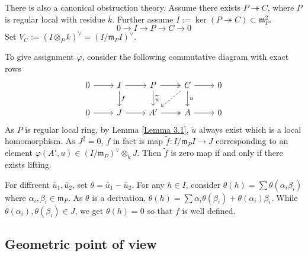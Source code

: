 \documentclass{ctexart}
\begin{document}
There is also a canonical obstruction theory.
Assume there exists $P \twoheadrightarrow C$, where $P$ is regular local with residue $k$.
Further assume $I := \ker(P \twoheadrightarrow C) \subset \mathfrak{m}_{P}^{2}$.
\begin{equation}
    0 \longrightarrow I \longrightarrow P \longrightarrow C \longrightarrow 0
\end{equation}
Set $V_{C} := (I \otimes_{P} k)^{\vee} = (I/\mathfrak{m}_{P}I)^{\vee}$.
\par
To give assignment $\varphi$, consider the following commutative diagram with exact rows
\begin{equation}
    \begin{tikzcd}
        0 \arrow[r] &
        I \arrow[r] \arrow[d, "f"] &
        P \arrow[r, twoheadrightarrow] \arrow[d, "\widetilde{u}"] &
        C \arrow[r] \arrow[d, "u"] \arrow[dl, dashrightarrow] &
        0 \\
        0 \arrow[r] &
        J \arrow[r] &
        A' \arrow[r, twoheadrightarrow] &
        A \arrow[r] &
        0 
    \end{tikzcd}
\end{equation}
As $P$ is regular local ring, by Lemma \ref{Lemma 3.1}, $\widetilde{u}$ always exist which is a local homomorphism.
As $J^{2} = 0$, $f$ in fact is map $\widetilde{f}: I/\mathfrak{m}_{P}I \rightarrow J$ corresponding to an element $\varphi(A', u)\in (I/\mathfrak{m}_{P})^{\vee} \otimes_{k} J$.
Then $\widetilde{f}$ is zero map if and only if there exists lifting.
\par
For diffreent $\widetilde{u_{1}}, \widetilde{u_{2}}$, set $\theta = \widetilde{u_{1}} - \widetilde{u_{2}}$.
For any $h\in I$, consider $\theta(h) = \sum \theta(\alpha_{i}\beta_{i})$ where $\alpha_{i}, \beta_{i}\in \mathfrak{m}_{P}$.
As $\theta$ is a derivation, $\theta(h) = \sum \alpha_{i}\theta(\beta_{i}) + \theta(\alpha_{i})\beta_{i}$.
While $\theta(\alpha_{i}), \theta(\beta_{i})\in J$, we get $\theta(h) = 0$ so that $f$ is well defined.

\subsection{Geometric point of view}
\label{subsection:Obstruction_Theory_of_Moduli_Space_Geometric_point_of_view}
\end{document}
